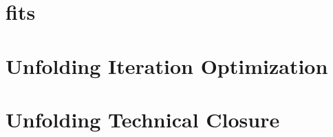 \documentclass{report}
\begin{document}
\section{\subsdzero fits}

\clearpage
\section{Unfolding Iteration Optimization}

\clearpage
\section{Unfolding Technical Closure}



%

\end{document}
